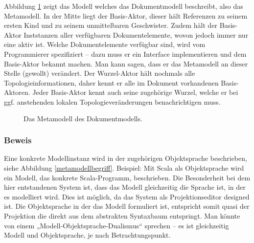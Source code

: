 Abbildung \ref{metamodell} zeigt das Modell welches das Dokumentmodell beschreibt, also das Metamodell. In der Mitte liegt der Basis-Aktor, dieser hält Referenzen zu seinem ersten Kind und zu seinem unmittelbaren Geschwister. Zudem hält der Basis-Aktor Inststanzen aller verfügbaren Dokumentelemente, wovon jedoch immer nur eine aktiv ist. Welche Dokumentelemente verfügbar sind, wird vom Programmierer spezifiziert -- dazu muss er ein Interface implementieren und dem Basis-Aktor bekannt machen. Man kann sagen, dass er das Metamodell an dieser Stelle (gewollt) verändert. Der Wurzel-Aktor hält nochmals alle Topologieinformationen, daher kennt er alle im Dokument vorhandenen Basis-Aktoren. Jeder Basis-Aktor kennt auch seine zugehörige Wurzel, welche er bei ggf. anstehenden lokalen Topologieveränderungen benachrichtigen muss.

 
\begin{figure}[h!]
\centering
{}
\caption[Metamodell des Dokumentmodells]{ Das Metamodell des Dokumentmodells. }\label{metamodell}
\end{figure}
 
\subsubsection{Beweis}\label{}

 
Eine konkrete Modellinstanz wird in der zugehörigen Objektsprache beschrieben, siehe Abbildung \ref{metamodellbegriff}. Beispiel: Mit Scala als Objektsprache wird ein Modell, das konkrete Scala-Programm, beschrieben. Die Besonderheit bei dem hier entstandenen System ist, dass das Modell gleichzeitig die Sprache ist, in der es modelliert wird. Dies ist möglich, da das System als Projektionseditor designed ist. Die Objektsprache in der das Modell formuliert ist, entspricht somit quasi der Projektion die direkt aus dem abstrakten Syntaxbaum entspringt. Man könnte von einem „Modell-Objektsprache-Dualismus“ sprechen -- es ist gleichzeitig Modell und Objektsprache, je nach Betrachtungspunkt.

